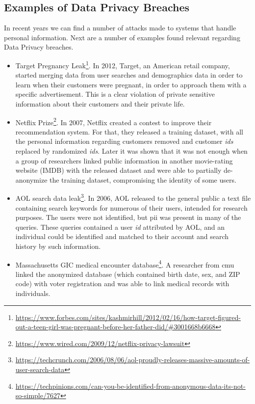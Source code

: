 \subsection{Examples of Data Privacy Breaches}
\label{ssec:ExamplesDataPrivacyBreaches}


In recent years we can find a number of attacks made to systems that handle personal information. Next are a number of examples found relevant regarding Data Privacy breaches.

\begin{itemize}
	
    \item Target Pregnancy Leak\footnote{\url{https://www.forbes.com/sites/kashmirhill/2012/02/16/how-target-figured-out-a-teen-girl-was-pregnant-before-her-father-did/\#3001668b6668}}. In 2012, Target, an American retail company, started merging data from user searches and demographics data in order to learn when their customers were pregnant, in order to approach them with a specific advertisement. This is a clear violation of private sensitive information about their customers and their private life.


    \item Netflix Prize\footnote{\url{https://www.wired.com/2009/12/netflix-privacy-lawsuit}}. In 2007, Netflix created a contest to improve their recommendation system. For that, they released a training dataset, with all the personal information regarding customers removed and customer \textit{ids} replaced by randomized \textit{ids}. Later it was shown that it was not enough when a group of researchers linked public information in another movie-rating website (IMDB) with the released dataset and were able to partially de-anonymize the training dataset, compromising the identity of some users.

    \item AOL search data leak\footnote{\url{https://techcrunch.com/2006/08/06/aol-proudly-releases-massive-amounts-of-user-search-data}}. In 2006, AOL released to the general public a text file containing search keywords for numerous of their users, intended for research purposes. The users were not identified, but \ac{pii} was present in many of the queries. These queries contained a user \textit{id} attributed by AOL, and an individual could be identified and matched to their account and search history by such information.



   \item Massachusetts GIC medical encounter database\footnote{\url{https://techpinions.com/can-you-be-identified-from-anonymous-data-its-not-so-simple/7627}}. A researcher from \ac{cmu} linked the anonymized database (which contained birth date, sex, and ZIP code) with voter registration and was able to link medical records with individuals.


\end{itemize}